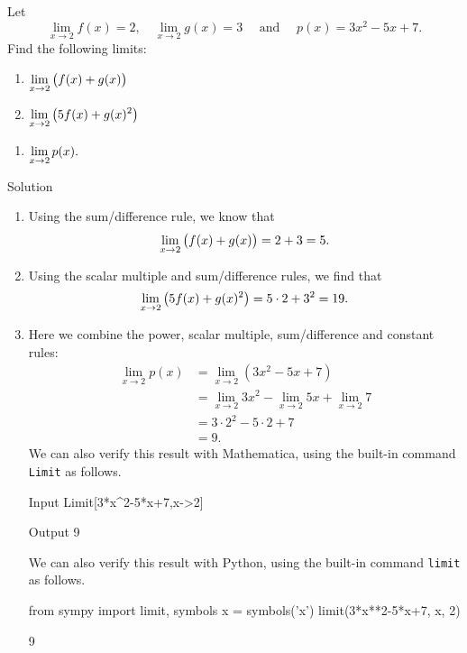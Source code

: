 \begin{example}\label{ex_basic_limit_1}
Let $$\lim_{x\to 2} f(x)=2,\quad\lim_{x\to 2} g(x) = 3\quad \text{\ and \ }\quad p(x) = 3x^2-5x+7.$$ Find the following limits:

\noindent\begin{minipage}[t]{.5\textwidth}
\begin{enumerate}
\item		$\displaystyle \lim_{x\to 2} \big(f(x) + g(x)\big)$
\item		$\displaystyle \lim_{x\to 2} \big(5f(x) + g(x)^2\big)$
\end{enumerate}
\end{minipage}
\begin{minipage}[t]{.5\textwidth}
\begin{enumerate}\addtocounter{enumi}{2}
\item		$\displaystyle \lim_{x\to 2} p(x).$
\end{enumerate}
\end{minipage}

Solution 

\begin{enumerate}
\item		Using the sum/difference rule, we know that 
$$\displaystyle \lim_{x\to 2} \big(f(x) + g(x)\big) = 2+3 =5.$$
\item		Using the scalar multiple and sum/difference rules, we find that 
$$\displaystyle \lim_{x\to 2} \big(5f(x) + g(x)^2\big) = 5\cdot 2 + 3^2 = 19.$$
\item		Here we combine the power, scalar multiple, sum/difference and constant rules:
\allowdisplaybreaks
				\begin{align*}
				\lim_{x\to 2} p(x) &= \lim_{x\to 2} (3x^2-5x+7) \\
				&= \lim_{x\to 2} 3x^2-\lim_{x\to 2} 5x+\lim_{x\to 2}7 \\
				 &= 3\cdot 2^2 - 5\cdot 2+7 \\
				 &= 9.
				\end{align*}
\ifmathematica
\ifcourse
We can also verify this result with Mathematica, using the built-in command \lstinline{Limit} as follows.
	\begin{mdframed}[default,backgroundcolor=gray!40,roundcorner=8pt]
\begin{mmaCell}[morefunctionlocal={x}]{Input}
  Limit[3*x^2-5*x+7,x->2]
\end{mmaCell}

\begin{mmaCell}{Output}
  9
\end{mmaCell}
\end{mdframed}
\fi
\fi

\ifpython
We can also verify this result with Python, using the built-in command \lstinline{limit} as follows.
\begin{pyin}
from sympy import limit, symbols
x = symbols('x')
limit(3*x**2-5*x+7, x, 2)
\end{pyin}
\begin{pyout}
9
\end{pyout}
\fi
\end{enumerate}
\end{example}

